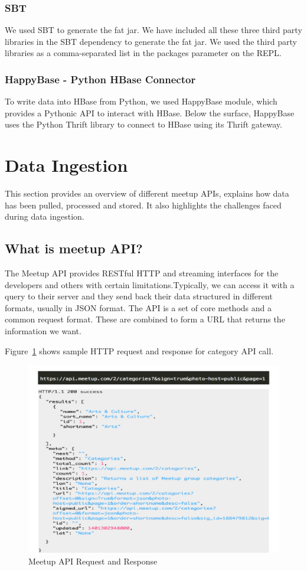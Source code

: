 \documentclass{acm_proc_article-sp}
\begin{document}
\subsubsection{SBT}
We used SBT \cite{www-sbt} to generate the fat jar.  We have included all these three third party libraries in the SBT dependency to generate the fat jar.  We used the third party libraries as a comma-separated list in the packages parameter on the REPL.

\subsubsection{HappyBase - Python HBase Connector}
To write data into HBase from Python, we used HappyBase module, which provides a Pythonic API to interact with HBase. Below the surface, HappyBase uses the Python Thrift library to connect to HBase using its Thrift gateway.

\section{Data Ingestion}
This section provides an overview of different meetup APIs, explains how data has been pulled, processed and stored. It also highlights the challenges faced during data ingestion.

\subsection{What is meetup API?}
The Meetup API \cite{www-meetup-api} provides RESTful HTTP and streaming interfaces for the developers and others with certain limitations.Typically, we can access it with a query to their server and they send back their data structured in different formats, usually in JSON format.
The API is a set of core methods and a common request format. These are combined to form a URL that returns the information we want.

Figure~\ref{F:requestresp} shows sample HTTP request and response for category API call.

\begin{figure}[!ht]
  \centering
      \includegraphics[width=1.0\columnwidth]{images/meetup_request_response.pdf}
  \caption{Meetup API Request and Response}\label{F:requestresp}
\end{figure}
\end{document}
